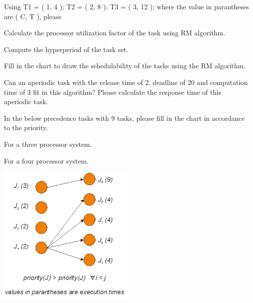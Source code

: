 

Using T1 = ( 1, 4 ); T2 = ( 2, 8 ); T3 = ( 3, 12 ); where the value in parantheses are ( C, T ), please 

\begin{unteraufgaben}

\item	Calculate the processor utilization factor of the task using RM algorithm.
\item	Compute the hyperperiod of the task set. 
\item	Fill in the chart to draw the schedulability of the tasks using the RM algorithm.
\item	Can an aperiodic task with the release time of 2, deadline of 20 and computation time of 3 fit in this algorithm? Please calculate the response time of this aperiodic task.

\end{unteraufgaben}


\pagebreak


In the below precedence tasks with 9 tasks, please fill in the chart in accordance to the priority.

\begin{unteraufgaben}

\item	For a three processor system.
\item	For a four processor system. 

\includegraphics[width=0.5\textwidth]{master-exam-2014/figure2.jpg}

\end{unteraufgaben}

